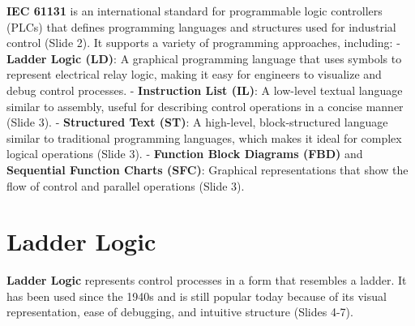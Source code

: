 \documentclass[
  14pt,
  a4paper,
  numbers=noendperiod,
  headinclude=true,
  footinclude=true,
  DIV=calc]{scrreprt}
\begin{document}
\textbf{IEC 61131} is an international standard for programmable logic
controllers (PLCs) that defines programming languages and structures
used for industrial control (Slide 2). It supports a variety of
programming approaches, including: - \textbf{Ladder Logic (LD)}: A
graphical programming language that uses symbols to represent electrical
relay logic, making it easy for engineers to visualize and debug control
processes. - \textbf{Instruction List (IL)}: A low-level textual
language similar to assembly, useful for describing control operations
in a concise manner (Slide 3). - \textbf{Structured Text (ST)}: A
high-level, block-structured language similar to traditional programming
languages, which makes it ideal for complex logical operations (Slide
3). - \textbf{Function Block Diagrams (FBD)} and \textbf{Sequential
Function Charts (SFC)}: Graphical representations that show the flow of
control and parallel operations (Slide 3).

\section{Ladder Logic}\label{ladder-logic}

\textbf{Ladder Logic} represents control processes in a form that
resembles a ladder. It has been used since the 1940s and is still
popular today because of its visual representation, ease of debugging,
and intuitive structure (Slides 4-7).
\end{document}
